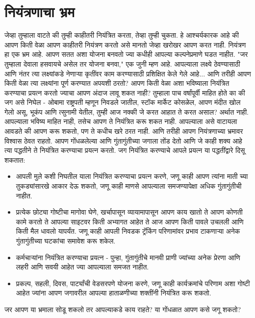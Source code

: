 \chapter{नियंत्रणाचा भ्रम}
जेव्हा तुम्हाला वाटते की तुम्ही काहीतरी नियंत्रित करता, तेव्हा तुम्ही चुकता.
हे आश्चर्यकारक आहे की आपण किती वेळा आपण काहीतरी नियंत्रण करतो असे मानतो जेव्हा खरोखर आपण करत नाही.
नियंत्रण हा एक भ्रम आहे.
आपण सतत अशा योजना बनवतो ज्या कधीही आपल्या कल्पनेप्रमाणे घडत नाहीत. "जर तुम्हाला देवाला हसवायचे असेल तर योजना बनवा," एक जुनी म्हण आहे.
आपल्याला लक्ष्ये ठेवण्यासाठी आणि नंतर त्या लक्ष्यांकडे नेणाऱ्या कृतींवर काम करण्यासाठी प्रशिक्षित केले गेले आहे... आणि तरीही आपण किती वेळा त्या लक्ष्यांना पूर्ण करण्यात अपयशी ठरतो? आपण किती वेळा अशा भविष्याला नियंत्रित करण्याचा प्रयत्न करतो ज्याचा आपण अंदाज लावू शकत नाही?
तुम्हाला पाच वर्षांपूर्वी माहित होते का की जग असे निघेल - ओबामा राष्ट्रपती म्हणून निवडले जातील, स्टॉक मार्केट कोसळेल, आपण मंदीत खोल गेलो असू, भूकंप आणि त्सुनामी येतील, तुम्ही आज नक्की जे करत आहात ते करत असाल?
अर्थात नाही. आपल्याला भविष्य माहित नाही, तसेच आपण ते नियंत्रित करू शकत नाही. आपल्याला असे वाटायला आवडते की आपण करू शकतो, पण ते कधीच खरे ठरत नाही.
आणि तरीही आपण नियंत्रणाच्या भ्रमावर विश्वास ठेवत राहतो. आपण गोंधळलेल्या आणि गुंतागुंतीच्या जगाला तोंड देतो आणि जे काही शक्य आहे त्या पद्धतीने ते नियंत्रित करण्याचा प्रयत्न करतो.
जग नियंत्रित करण्याचे आपले प्रयत्न या पद्धतींद्वारे दिसू शकतात:
\begin{itemize}
\item आपली मुले कशी निघतील याला नियंत्रित करण्याचा प्रयत्न करणे, जणू काही आपण त्यांना माती च्या तुकड्यांसारखे आकार देऊ शकतो, जणू काही माणसे आपल्याला समजण्यापेक्षा अधिक गुंतागुंतीची नाहीत.
\item प्रत्येक छोट्या गोष्टीचा मागोवा घेणे, खर्चापासून व्यायामापासून आपण काय खातो ते आपण कोणती कामे करतो ते आपल्या साइटवर किती अभ्यागत आहेत ते आज आपण किती पावले उचलली आणि किती मैल धावलो यापर्यंत. जणू काही आपली निवडक ट्रॅकिंग परिणामांवर प्रभाव टाकणाऱ्या अनेक गुंतागुंतीच्या घटकांचा समावेश करू शकेल.
\item कर्मचाऱ्यांना नियंत्रित करण्याचा प्रयत्न - पुन्हा, गुंतागुंतीचे मानवी प्राणी ज्यांच्या अनेक प्रेरणा आणि लहरी आणि सवयी आहेत ज्या आपल्याला समजत नाहीत.
\item प्रकल्प, सहली, दिवस, पार्ट्यांची वेडसरपणे योजना करणे, जणू काही कार्यक्रमांचे परिणाम अशा गोष्टी आहेत ज्यांना आपण जगावरील आपल्या हाताळणीच्या शक्तींनी नियंत्रित करू शकतो.
\end{itemize}
जर आपण या भ्रमाला सोडू शकलो तर आपल्याकडे काय राहते? या गोंधळात आपण कसे जगू शकतो?
